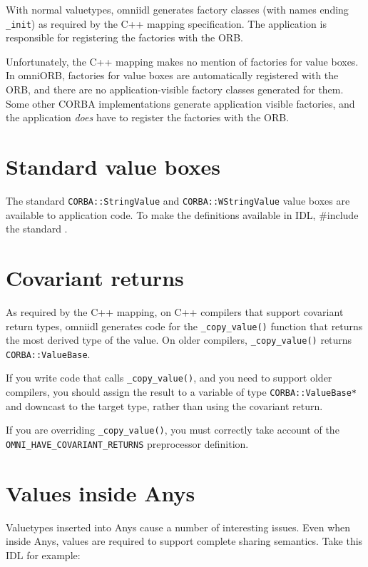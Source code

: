 \documentclass[11pt,twoside,a4paper]{book}
\newcommand{\type}[1]{\texttt{#1}}
\newcommand{\code}[1]{\texttt{#1}}
\newcommand{\op}[1]{\texttt{#1()}}
\newcommand{\file}{\begingroup \urlstyle{tt}\Url}
\begin{document}
With normal valuetypes, omniidl generates factory classes (with names
ending \code{\_init}) as required by the C++ mapping specification.
The application is responsible for registering the factories with the
ORB.

Unfortunately, the C++ mapping makes no mention of factories for value
boxes. In omniORB, factories for value boxes are automatically
registered with the ORB, and there are no application-visible factory
classes generated for them. Some other CORBA implementations generate
application visible factories, and the application \emph{does} have to
register the factories with the ORB.


\section{Standard value boxes}

The standard \type{CORBA::StringValue} and \type{CORBA::WStringValue}
value boxes are available to application code. To make the definitions
available in IDL, \#include the standard \file{orb.idl}.


\section{Covariant returns}

As required by the C++ mapping, on C++ compilers that support
covariant return types, omniidl generates code for the
\op{\_copy\_value} function that returns the most derived type of the
value. On older compilers, \op{\_copy\_value} returns
\type{CORBA::ValueBase}.

If you write code that calls \op{\_copy\_value}, and you need to
support older compilers, you should assign the result to a variable of
type \type{CORBA::ValueBase*} and downcast to the target type, rather
than using the covariant return.

If you are overriding \op{\_copy\_value}, you must correctly take
account of the \code{OMNI\_HAVE\_COVARIANT\_RETURNS} preprocessor
definition.



\section{Values inside Anys}

Valuetypes inserted into Anys cause a number of interesting issues.
Even when inside Anys, values are required to support complete sharing
semantics. Take this IDL for example:
\end{document}
